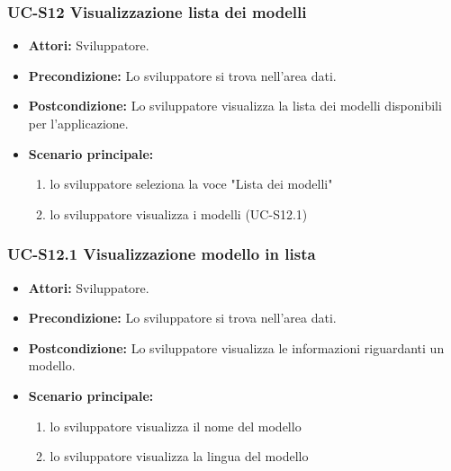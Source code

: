 	\subsubsection{UC-S12 Visualizzazione lista dei modelli}
		\begin{itemize}
			\item \textbf{Attori:} Sviluppatore.
			\item \textbf{Precondizione:} Lo sviluppatore si trova nell'area dati.
			\item \textbf{Postcondizione:} Lo sviluppatore visualizza la lista dei modelli disponibili per l'applicazione.
			\item \textbf{Scenario principale:}
			\begin{enumerate}
					\item lo sviluppatore seleziona la voce "Lista dei modelli"
					\item lo sviluppatore visualizza i modelli (UC-S12.1)
				\end{enumerate}
		\end{itemize}	
		
\subsubsection{UC-S12.1 Visualizzazione modello in lista}
		\begin{itemize}
			\item \textbf{Attori:} Sviluppatore.
			\item \textbf{Precondizione:} Lo sviluppatore si trova nell'area dati.
			\item \textbf{Postcondizione:} Lo sviluppatore visualizza le informazioni riguardanti un modello.
			\item \textbf{Scenario principale:}
			\begin{enumerate}
					\item lo sviluppatore visualizza il nome del modello
					\item lo sviluppatore visualizza la lingua del modello
				\end{enumerate}
		\end{itemize}			
	
